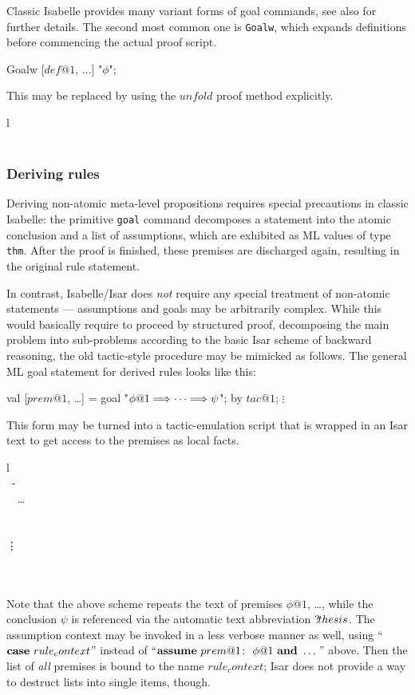 \medskip Classic Isabelle provides many variant forms of goal commands, see
also \cite{isabelle-ref} for further details.  The second most common one is
\texttt{Goalw}, which expands definitions before commencing the actual proof
script.
\begin{ttbox}
 Goalw [\(def@1\), \(\dots\)] "\(\phi\)";
\end{ttbox}
This may be replaced by using the $unfold$ proof method explicitly.
\begin{matharray}{l}
 \\
\quad {} \\
\end{matharray}


\subsubsection{Deriving rules}

Deriving non-atomic meta-level propositions requires special precautions in
classic Isabelle: the primitive \texttt{goal} command decomposes a statement
into the atomic conclusion and a list of assumptions, which are exhibited as
ML values of type \texttt{thm}.  After the proof is finished, these premises
are discharged again, resulting in the original rule statement.

In contrast, Isabelle/Isar does \emph{not} require any special treatment of
non-atomic statements --- assumptions and goals may be arbitrarily complex.
While this would basically require to proceed by structured proof, decomposing
the main problem into sub-problems according to the basic Isar scheme of
backward reasoning, the old tactic-style procedure may be mimicked as follows.
The general ML goal statement for derived rules looks like this:
\begin{ttbox}
 val [\(prem@1\), \dots] = goal "\(\phi@1 \Imp \dots \Imp \psi\)";
 by \(tac@1\);
   \(\vdots\)
\end{ttbox}
This form may be turned into a tactic-emulation script that is wrapped in an
Isar text to get access to the premises as local facts.
\begin{matharray}{l}
   \\
  \PROOF{}~- \\
  \quad {}~\AND~\dots \\
  \quad {} \\
  \qquad {} \\
  \qquad\quad \vdots \\
  \qquad \DONE \\
  \QED{} \\
\end{matharray}
Note that the above scheme repeats the text of premises $\phi@1$, \dots, while
the conclusion $\psi$ is referenced via the automatic text abbreviation
${?\!thesis}$.  The assumption context may be invoked in a less verbose
manner as well, using ``${\mathord{\mathbf{case}}}~rule_context$'' instead of
``$\ASSUME{prem@1}{\phi@1}~\AND~\dots$'' above.  Then the list of \emph{all}
premises is bound to the name $rule_context$; Isar does not provide a way to
destruct lists into single items, though.

